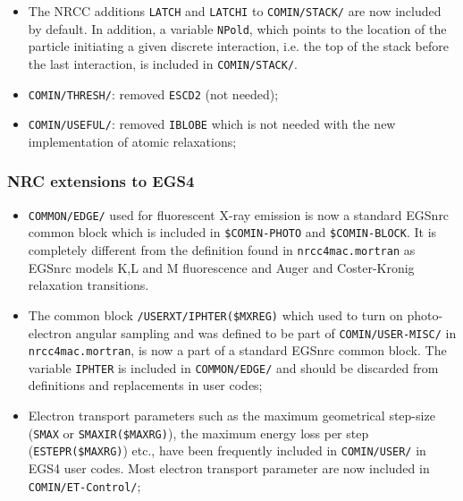 \begin{itemize}
\item
The NRCC additions {\tt LATCH} and {\tt LATCHI}
to {\tt COMIN/STACK/} are now included by default. In addition,
a variable {\tt NPold}, which points to the location of the particle
initiating a given discrete interaction, i.e. the top
of the stack before the last interaction, is included in {\tt COMIN/STACK/}.
  

\item
{\tt COMIN/THRESH/}: removed {\tt ESCD2} (not needed);
 

\item
{\tt COMIN/USEFUL/}: removed {\tt IBLOBE} which is not needed
with the new implementation of atomic relaxations;
 

\end{itemize}

\subsubsection{NRC extensions to EGS4}

\begin{itemize}
\item
{\tt COMMON/EDGE/} used for fluorescent X-ray emission
is now a standard EGSnrc common block which is included
in {\tt \$COMIN-PHOTO} and {\tt \$COMIN-BLOCK}.
It is completely different from the definition found
in {\tt nrcc4mac.mortran} as EGSnrc models K,L and M
fluorescence and Auger and Coster-Kronig relaxation transitions.
 

\item
The common block {\tt /USERXT/IPHTER(\$MXREG)} which
used to turn on photo-electron
angular sampling and was defined to be part of {\tt COMIN/USER-MISC/}
in {\tt nrcc4mac.mortran},
is now a part of a standard EGSnrc common block. The variable {\tt IPHTER}
is included in {\tt COMMON/EDGE/} and should be discarded from definitions
and replacements in user codes;
  

\item
Electron transport parameters such as the maximum geometrical step-size
({\tt SMAX} or {\tt SMAXIR(\$MAXRG)}), the maximum energy loss per step
({\tt ESTEPR(\$MAXRG)}) etc., have been frequently included in
{\tt COMIN/USER/} in EGS4 user codes. Most electron transport
parameter are now included in {\tt COMIN/ET-Control/};
   

\end{itemize}

